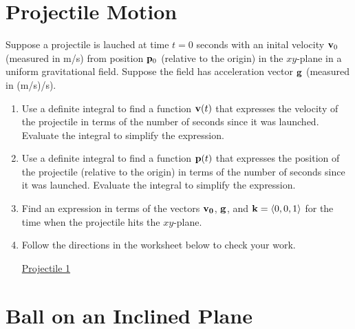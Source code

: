 \documentclass{ximera}
\begin{document}
\section{Projectile Motion}
\begin{question}  \label{Qerwer}
Suppose a projectile is lauched at time $t=0$ seconds with an inital velocity ${\bf v}_0$ (measured in m/s) from position ${\bf p}_0$ (relative to the origin) in the $xy$-plane in a uniform gravitational field. Suppose the field has acceleration vector ${\bf g}$ (measured in (m/s)/s).

\begin{enumerate}

\item Use a definite integral to find a function ${\bf v}(t)$ that expresses the velocity of the projectile in terms of the number of seconds since it was launched. Evaluate the integral to simplify the expression.

\item Use a definite integral to find a function ${\bf p}(t)$ that expresses the position of the projectile (relative to the origin) in terms of the number of seconds since it was launched. Evaluate the integral to simplify the expression.

\item Find an expression in terms of the vectors ${\bf v_0}$, ${\bf g}$, and ${\bf k}=\langle 0,0,1 \rangle$ for the time when the projectile hits the $xy$-plane.

\item Follow the directions in the worksheet below to check your work.

\begin{onlineOnly}
    \begin{center}
\end{center}
\end{onlineOnly}

\href{https://www.desmos.com/3d/csovv2cwn4}{Projectile 1}

\end{enumerate} 

\end{question}


\section{Ball on an Inclined Plane}
\end{document}
